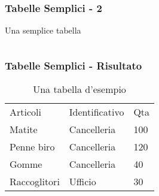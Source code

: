 \begin{frame}[fragile]

  \frametitle{Tabelle Semplici - 2}

  \begin{esempio}{Una semplice tabella}
  
  \begin{code}
  \inputminted[linenos]{latex}{res/examples/tabellaSemplice.tex}
  \end{code}
  \end{esempio}

\end{frame}

\begin{frame}
 
  \frametitle{Tabelle Semplici - Risultato}
  
  \begin{table}[h!]
    \centering
    \begin{tabular}{lll}
    Articoli      & Identificativo & Qta \\
    Matite        & Cancelleria    & 100 \\
    Penne biro    & Cancelleria    & 120 \\
    Gomme         & Cancelleria    & 40  \\
    Raccoglitori  & Ufficio        & 30
\end{tabular}
\caption{Una tabella d'esempio}
\label{tabella:esempio}
\end{table} 
\end{frame}
